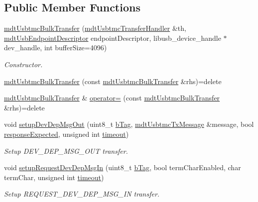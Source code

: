 \subsection*{Public Member Functions}
\begin{DoxyCompactItemize}
\item 
\hyperlink{classmdt_usbtmc_bulk_transfer_ae4164471ca85026006352e0e836146ea}{mdt\-Usbtmc\-Bulk\-Transfer} (\hyperlink{classmdt_usbtmc_transfer_handler}{mdt\-Usbtmc\-Transfer\-Handler} \&th, \hyperlink{classmdt_usb_endpoint_descriptor}{mdt\-Usb\-Endpoint\-Descriptor} endpoint\-Descriptor, libusb\-\_\-device\-\_\-handle $\ast$dev\-\_\-handle, int buffer\-Size=4096)
\begin{DoxyCompactList}\small\item\em Constructor. \end{DoxyCompactList}\item 
\hyperlink{classmdt_usbtmc_bulk_transfer_aedb3f658126c79f4b749cc655d192c43}{mdt\-Usbtmc\-Bulk\-Transfer} (const \hyperlink{classmdt_usbtmc_bulk_transfer}{mdt\-Usbtmc\-Bulk\-Transfer} \&rhs)=delete
\item 
\hyperlink{classmdt_usbtmc_bulk_transfer}{mdt\-Usbtmc\-Bulk\-Transfer} \& \hyperlink{classmdt_usbtmc_bulk_transfer_ad23ec92f7262ac2e6f89cf7bfa518756}{operator=} (const \hyperlink{classmdt_usbtmc_bulk_transfer}{mdt\-Usbtmc\-Bulk\-Transfer} \&rhs)=delete
\item 
void \hyperlink{classmdt_usbtmc_bulk_transfer_a36922717023b588ecf02cd771a5a3a4b}{setup\-Dev\-Dep\-Msg\-Out} (uint8\-\_\-t \hyperlink{classmdt_usbtmc_bulk_transfer_a7975795ea5299a1a82c1ec303be24e2e}{b\-Tag}, \hyperlink{classmdt_usbtmc_tx_message}{mdt\-Usbtmc\-Tx\-Message} \&message, bool \hyperlink{classmdt_usbtmc_bulk_transfer_afda5d4a8eef1381cc7ebc121b95a112e}{response\-Expected}, unsigned int \hyperlink{classmdt_usb_transfer_a3262511f6062348132e7ee689c24226c}{timeout})
\begin{DoxyCompactList}\small\item\em Setup D\-E\-V\-\_\-\-D\-E\-P\-\_\-\-M\-S\-G\-\_\-\-O\-U\-T transfer. \end{DoxyCompactList}\item 
void \hyperlink{classmdt_usbtmc_bulk_transfer_a374cc50b3dafce30492ab7c793efd73e}{setup\-Request\-Dev\-Dep\-Msg\-In} (uint8\-\_\-t \hyperlink{classmdt_usbtmc_bulk_transfer_a7975795ea5299a1a82c1ec303be24e2e}{b\-Tag}, bool term\-Char\-Enabled, char term\-Char, unsigned int \hyperlink{classmdt_usb_transfer_a3262511f6062348132e7ee689c24226c}{timeout})
\begin{DoxyCompactList}\small\item\em Setup R\-E\-Q\-U\-E\-S\-T\-\_\-\-D\-E\-V\-\_\-\-D\-E\-P\-\_\-\-M\-S\-G\-\_\-\-I\-N transfer. \end{DoxyCompactList}\item 

\end{DoxyCompactItemize}
